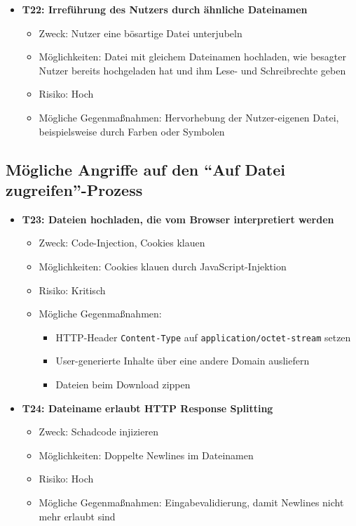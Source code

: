 \documentclass[12pt,DIV14,BCOR10mm,a4paper,parskip=half-,headsepline,headinclude,english,ngerman,bibliography=totocnumbered]{scrreprt}
\begin{document}
\begin{itemize}
  \hypertarget{threat22}{}
  \item \textbf{T22: Irreführung des Nutzers durch ähnliche Dateinamen}
  \begin{itemize}
  \item Zweck: Nutzer eine bösartige Datei unterjubeln
  \item Möglichkeiten: Datei mit gleichem Dateinamen hochladen, wie besagter Nutzer bereits hochgeladen hat und ihm Lese- und Schreibrechte geben
  \item Risiko: Hoch
  \item Mögliche Gegenmaßnahmen: Hervorhebung der Nutzer-eigenen Datei, beispielsweise durch Farben oder Symbolen
  \end{itemize}
\end{itemize}

\subsection{Mögliche Angriffe auf den \enquote{Auf Datei zugreifen}-Prozess}

\begin{itemize}
  \hypertarget{threat23}{}
  \item \textbf{T23: Dateien hochladen, die vom Browser interpretiert werden}
  \begin{itemize}
  \item Zweck: Code-Injection, Cookies klauen
  \item Möglichkeiten: Cookies klauen durch JavaScript-Injektion
  \item Risiko: Kritisch
  \item Mögliche Gegenmaßnahmen:
    \begin{itemize}
      \item HTTP-Header \texttt{Content-Type} auf \texttt{application/octet-stream} setzen
      \item User-generierte Inhalte über eine andere Domain ausliefern
      \item Dateien beim Download zippen
    \end{itemize}
  \end{itemize}

  \hypertarget{threat24}{}
  \item \textbf{T24: Dateiname erlaubt HTTP Response Splitting}
  \begin{itemize}
  \item Zweck: Schadcode injizieren
  \item Möglichkeiten: Doppelte Newlines im Dateinamen
  \item Risiko: Hoch
  \item Mögliche Gegenmaßnahmen: Eingabevalidierung, damit Newlines nicht mehr erlaubt sind
  \end{itemize}
\end{itemize}
\end{document}
